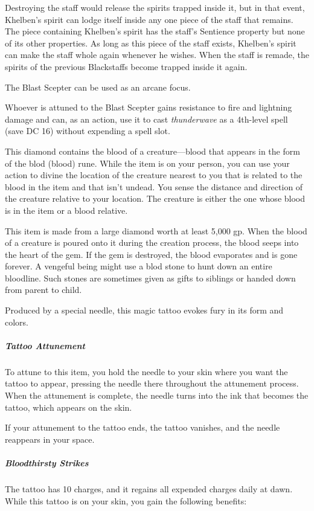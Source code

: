 \documentclass[10pt,a4paper,twoside,bg=print,twocolumn,openany,nodeprecatedcode]{dndbook}
\begin{document}
Destroying the staff would release the spirits trapped inside it, but in that event, Khelben's spirit can lodge itself inside any one piece of the staff that remains. The piece containing Khelben's spirit has the staff's Sentience property but none of its other properties. As long as this piece of the staff exists, Khelben's spirit can make the staff whole again whenever he wishes. When the staff is remade, the spirits of the previous Blackstaffs become trapped inside it again.

The Blast Scepter can be used as an arcane focus.

Whoever is attuned to the Blast Scepter gains resistance to fire and lightning damage and can, as an action, use it to cast \textit{thunderwave} as a 4th-level spell (save DC 16) without expending a spell slot.

This diamond contains the blood of a creature—blood that appears in the form of the blod (blood) rune. While the item is on your person, you can use your action to divine the location of the creature nearest to you that is related to the blood in the item and that isn't undead. You sense the distance and direction of the creature relative to your location. The creature is either the one whose blood is in the item or a blood relative.

This item is made from a large diamond worth at least 5,000 gp. When the blood of a creature is poured onto it during the creation process, the blood seeps into the heart of the gem. If the gem is destroyed, the blood evaporates and is gone forever. A vengeful being might use a blod stone to hunt down an entire bloodline. Such stones are sometimes given as gifts to siblings or handed down from parent to child.

Produced by a special needle, this magic tattoo evokes fury in its form and colors.

\subparagraph{Tattoo Attunement}
To attune to this item, you hold the needle to your skin where you want the tattoo to appear, pressing the needle there throughout the attunement process. When the attunement is complete, the needle turns into the ink that becomes the tattoo, which appears on the skin.

If your attunement to the tattoo ends, the tattoo vanishes, and the needle reappears in your space.

\subparagraph{Bloodthirsty Strikes}
The tattoo has 10 charges, and it regains all expended charges daily at dawn. While this tattoo is on your skin, you gain the following benefits:
\end{document}
